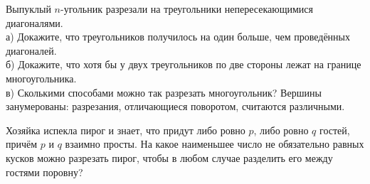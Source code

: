 \problem Выпуклый $n$-угольник разрезали на треугольники непересекающимися диагоналями.\\
а) Докажите, что треугольников получилось на один больше, чем проведённых диагоналей.\\
б) Докажите, что хотя бы у двух треугольников по две стороны лежат на границе многоугольника.\\
в) Сколькими способами можно так разрезать многоугольник? Вершины занумерованы: разрезания, отличающиеся поворотом, считаются различными.

\problem Хозяйка испекла пирог и знает, что придут либо ровно $p$, либо ровно $q$ гостей, причём $p$ и $q$ взаимно просты. На какое наименьшее число не обязательно равных кусков можно разрезать пирог, чтобы в любом случае разделить его между гостями поровну?
